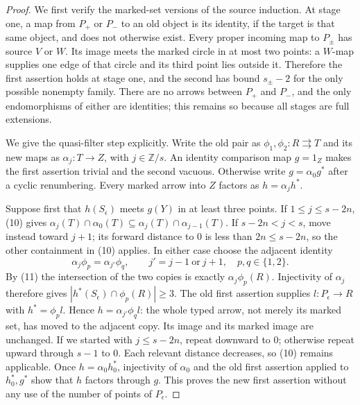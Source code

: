 \begin{proof}
We first verify the marked-set versions of the source induction.
At stage one, a map from $P_+$ or $P_-$ to an old object is its identity,
if the target is that same object, and does not otherwise exist.
Every proper incoming map to $P_\pm$ has source $V$ or $W$. Its image
meets the marked circle in at most two points: a $W$-map supplies one
edge of that circle and its third point lies outside it. Therefore the
first assertion holds at stage one, and the second has bound
$s_\pm-2$ for the only possible nonempty family. There are no arrows
between $P_+$ and $P_-$, and the only endomorphisms of either are
identities; this remains so because all stages are full extensions.

We give the quasi-filter step explicitly. Write the old pair as
$\phi_1,\phi_2:R\rightrightarrows T$ and its new maps as
$\alpha_j:T\to Z$, with $j\in\mathbb Z/s$. An identity comparison
map $g=1_Z$ makes the first assertion trivial and the second vacuous.
Otherwise write $g=\alpha_0g^*$ after a cyclic renumbering. Every marked
arrow into $Z$ factors as $h=\alpha_jh^*$.

Suppose first that $h(S_\epsilon)$ meets $g(Y)$ in at least three
points. If $1\leq j\leq s-2n$, (10) gives
$\alpha_j(T)\cap\alpha_0(T)\subseteq
\alpha_j(T)\cap\alpha_{j-1}(T)$. If $s-2n<j<s$, move instead toward
$j+1$; its forward distance to $0$ is less than $2n\leq s-2n$, so the
other containment in (10) applies. In either case choose the adjacent
identity
\[
 \alpha_j\phi_p=\alpha_{j'}\phi_q,
 \qquad j'=j-1\ \text{or}\ j+1,
 \quad p,q\in\{1,2\}.
\]
By (11) the intersection of the two copies is exactly
$\alpha_j\phi_p(R)$. Injectivity of $\alpha_j$ therefore gives
$|h^*(S_\epsilon)\cap\phi_p(R)|\geq3$. The old first assertion
supplies $l:P_\epsilon\to R$ with $h^*=\phi_pl$. Hence
$h=\alpha_{j'}\phi_ql$: the whole typed arrow, not merely its marked
set, has moved to the adjacent copy. Its image and its marked image
are unchanged. If we started with $j\leq s-2n$, repeat downward to
$0$; otherwise repeat upward through $s-1$ to $0$. Each relevant
distance decreases, so (10) remains applicable. Once
$h=\alpha_0h_0^*$, injectivity of $\alpha_0$ and the old first
assertion applied to $h_0^*,g^*$ show that $h$ factors through $g$.
This proves the new first assertion without any use of the number of
points of $P_\epsilon$.


\end{proof}
